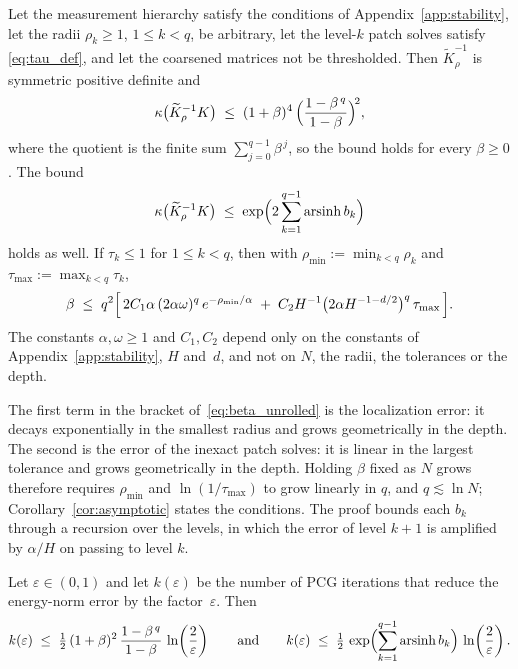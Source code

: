 \documentclass[hidelinks]{siamart}
\theoremstyle{nonumberplain}
\numberwithin{theorem}{section}
\begin{document}
\begin{theorem}\label{prop:precond_conditioning}
Let the measurement hierarchy satisfy the conditions of
Appendix~\ref{app:stability}, let the radii $\rho_k \geq 1$,
$1 \leq k < q$, be arbitrary, let the level-$k$ patch solves satisfy
\eqref{eq:tau_def}, and let the coarsened matrices not be thresholded.
Then $\widetilde{K}_\rho^{-1}$ is symmetric positive definite and
\begin{equation}\label{eq:kappa_bound}
  \kappa\bigl(\widetilde{K}_\rho^{-1} K\bigr)
  \;\leq\; (1+\beta)^4\,
  \Bigl( \frac{1 - \beta^{\,q}}{1 - \beta} \Bigr)^{\!2} ,
\end{equation}
where the quotient is the finite sum $\sum_{j=0}^{q-1} \beta^{\,j}$, so
the bound holds for every $\beta \geq 0$.  The bound
\begin{equation}\label{eq:kappa_arsinh}
  \kappa\bigl(\widetilde{K}_\rho^{-1} K\bigr)
  \;\leq\; \exp\Bigl( 2 \sum_{k=1}^{q-1} \operatorname{arsinh} b_k \Bigr)
\end{equation}
holds as well.  If $\tau_k \leq 1$ for $1 \leq k < q$, then with
$\rho_{\min} := \min_{k<q} \rho_k$ and $\tau_{\max} := \max_{k<q} \tau_k$,
\begin{equation}\label{eq:beta_unrolled}
  \beta \;\leq\; q^2 \Bigl[\, 2 C_1 \alpha\,(2\alpha\omega)^{q}\,
    e^{-\rho_{\min}/\alpha}
    \;+\; C_2 H^{-1} \bigl(2\alpha H^{-1-d/2}\bigr)^{q}\, \tau_{\max} \,\Bigr] .
\end{equation}
The constants $\alpha, \omega \geq 1$ and $C_1, C_2$ depend only on the
constants of Appendix~\ref{app:stability}, $H$ and~$d$, and not on $N$,
the radii, the tolerances or the depth.
\end{theorem}

The first term in the bracket of~\eqref{eq:beta_unrolled} is the
localization error: it decays exponentially in the smallest radius and
grows geometrically in the depth.  The second is the error of the inexact
patch solves: it is linear in the largest tolerance and grows
geometrically in the depth.  Holding $\beta$ fixed as $N$ grows therefore
requires $\rho_{\min}$ and $\ln(1/\tau_{\max})$ to grow linearly in $q$,
and $q \lesssim \ln N$; Corollary~\ref{cor:asymptotic} states the
conditions.  The proof bounds each $b_k$ through a recursion over the
levels, in which the error of level $k+1$ is amplified by $\alpha/H$ on
passing to level $k$.

\begin{corollary}\label{cor:iteration_count}
Let $\varepsilon \in (0,1)$ and let $k(\varepsilon)$ be the number of
PCG iterations that reduce the energy-norm error by the
factor~$\varepsilon$.  Then
\begin{equation}\label{eq:cg_iter_bound}
  k(\varepsilon) \;\leq\;
  \tfrac{1}{2}\,(1+\beta)^2\,
  \frac{1 - \beta^{\,q}}{1 - \beta}
  \,\ln\!\left(\frac{2}{\varepsilon}\right)
  \qquad\text{and}\qquad
  k(\varepsilon) \;\leq\;
  \tfrac{1}{2}\,
  \exp\Bigl( \sum_{k=1}^{q-1} \operatorname{arsinh} b_k \Bigr)
  \,\ln\!\left(\frac{2}{\varepsilon}\right).
\end{equation}
\end{corollary}
\end{document}
